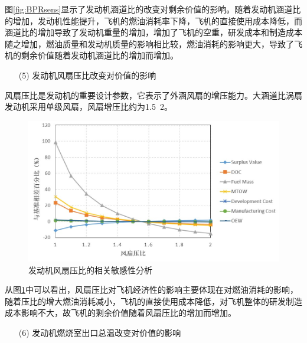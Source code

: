 \documentclass[12pt,a4paper]{report}
\begin{document}
图\ref{fig:BPRsens}显示了发动机涵道比的改变对剩余价值的影响。随着发动机涵道比的增加，发动机性能提升，飞机的燃油消耗率下降，飞机的直接使用成本降低，而涵道比的增加导致了发动机重量的增加，增加了飞机的空重，研发成本和制造成本随之增加，燃油质量和发动机质量的影响相比较，燃油消耗的影响更大，导致了飞机的剩余价值随着发动机涵道比的增加而增加。

 \begin{itemize}
    \item[(5)] 发动机风扇压比改变对价值的影响
\end{itemize}

风扇压比是发动机的重要设计参数，它表示了外涵风扇的增压能力。大涵道比涡扇发动机采用单级风扇，风扇增压比约为1.5~2。
 \begin{figure}[!htp]
  \centering
  \includegraphics[width=.9\textwidth]{eps/SVvsFPR.jpg}
  \caption{发动机风扇压比的相关敏感性分析}
 \label{fig:FPRsens}
\end{figure}
从图\ref{fig:FPRsens}中可以看出，风扇压比对飞机经济性的影响主要体现在对燃油消耗的影响，随着压比的增大燃油消耗减小，飞机的直接使用成本降低，对飞机整体的研发制造成本影响不大，故飞机的剩余价值随着风扇压比的增加而增加。

 \begin{itemize}
    \item[(6)] 发动机燃烧室出口总温改变对价值的影响
\end{itemize}
\end{document}
